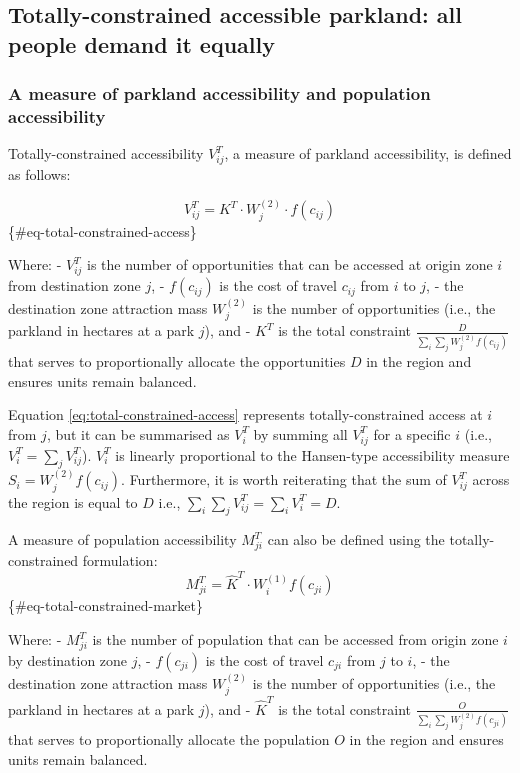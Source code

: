 \documentclass[
11pt, %
oneside, %
english, %
singlespacing, %
]{macthesis} %
\begin{document}
\subsection{Totally-constrained accessible parkland: all people demand it equally}\label{totally-constrained-accessible-parkland-all-people-demand-it-equally}

\subsubsection{A measure of parkland accessibility and population accessibility}\label{a-measure-of-parkland-accessibility-and-population-accessibility}

Totally-constrained accessibility \(V^T_{ij}\), a measure of parkland accessibility, is defined as follows:

\[
V^T_{ij} = K^T \cdot W_j^{(2)} \cdot f(c_{ij})
\] \{\#eq-total-constrained-access\}

Where:
- \(V^T_{ij}\) is the number of opportunities that can be accessed at origin zone \(i\) from destination zone \(j\),
- \(f(c_{ij})\) is the cost of travel \(c_{ij}\) from \(i\) to \(j\),
- the destination zone attraction mass \(W_j^{(2)}\) is the number of opportunities (i.e., the parkland in hectares at a park \(j\)), and
- \(K^T\) is the total constraint \(\frac{D}{\sum_i\sum_j W^{(2)}_jf(c_{ij})}\) that serves to proportionally allocate the opportunities \(D\) in the region and ensures units remain balanced.

Equation \ref{eq:total-constrained-access} represents totally-constrained access at \(i\) from \(j\), but it can be summarised as \(V^T_i\) by summing all \(V^T_{ij}\) for a specific \(i\) (i.e., \(V^T_i = \sum_j V^T_{ij}\)). \(V^T_i\) is linearly proportional to the Hansen-type accessibility measure \(S_i = W^{(2)}_jf(c_{ij})\). Furthermore, it is worth reiterating that the sum of \(V^T_{ij}\) across the region is equal to \(D\) i.e., \(\sum_i\sum_j V^T_{ij} = \sum_i V^T_{i} = D\).

A measure of population accessibility \(M^T_{ji}\) can also be defined using the totally-constrained formulation:
\[
M^T_{ji} = \hat K^T \cdot W_i^{(1)} f(c_{ji})
\] \{\#eq-total-constrained-market\}

Where:
- \(M^T_{ji}\) is the number of population that can be accessed from origin zone \(i\) by destination zone \(j\),
- \(f(c_{ji})\) is the cost of travel \(c_{ji}\) from \(j\) to \(i\),
- the destination zone attraction mass \(W_j^{(2)}\) is the number of opportunities (i.e., the parkland in hectares at a park \(j\)), and
- \(\hat K^T\) is the total constraint \(\frac{O}{\sum_i\sum_j W^{(2)}_jf(c_{ji})}\) that serves to proportionally allocate the population \(O\) in the region and ensures units remain balanced.
\end{document}

